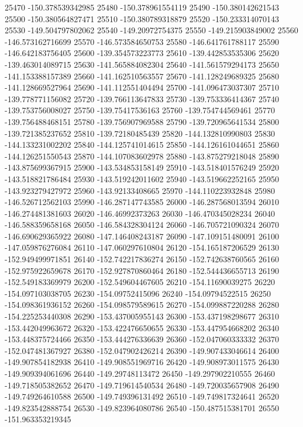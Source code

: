 {25470 -150.378539342985
25480 -150.378961554119
25490 -150.380142621543
25500 -150.380564827471
25510 -150.380789318879
25520 -150.233314070143
25530 -149.504797802062
25540 -149.20972754375
25550 -149.215903849002
25560 -146.573162716699
25570 -146.573584650753
25580 -146.641761788117
25590 -146.642183756405
25600 -139.354573223773
25610 -139.442853535306
25620 -139.463014089715
25630 -141.565884082304
25640 -141.561579294173
25650 -141.153388157389
25660 -141.162510563557
25670 -141.128249689325
25680 -141.128669527964
25690 -141.112551404494
25700 -141.096473037307
25710 -139.778771156082
25720 -139.766113647833
25730 -139.753336414367
25740 -139.753756008027
25750 -139.75417536163
25760 -139.754744569461
25770 -139.756488468151
25780 -139.756907969588
25790 -139.720965641534
25800 -139.721385237652
25810 -139.72180485439
25820 -144.132810990803
25830 -144.133231002202
25840 -144.125741014615
25850 -144.126161044651
25860 -144.126251550543
25870 -144.107083602978
25880 -143.875279218048
25890 -143.875699367915
25900 -143.534853158149
25910 -143.518401576249
25920 -143.518821786484
25930 -143.519242011602
25940 -143.519662252165
25950 -143.923279427972
25960 -143.92133408665
25970 -144.110223932848
25980 -146.526712562103
25990 -146.287147743585
26000 -146.287568013594
26010 -146.274481381603
26020 -146.46992373263
26030 -146.470345028234
26040 -146.588359658168
26050 -146.584328304124
26060 -146.705721090324
26070 -146.690629365922
26080 -147.146408243187
26090 -147.109151480091
26100 -147.059876276084
26110 -147.060297610804
26120 -154.165187206529
26130 -152.949499971851
26140 -152.742217836274
26150 -152.742638760565
26160 -152.975922659678
26170 -152.927870860464
26180 -152.544436655713
26190 -152.549183369979
26200 -152.549604467605
26210 -154.11690039275
26220 -154.097103038705
26230 -154.09752415096
26240 -154.09794522515
26250 -154.098361936152
26260 -154.098579589615
26270 -154.099887220288
26280 -154.225253440308
26290 -153.437005955143
26300 -153.437198298677
26310 -153.442049963672
26320 -153.422476650655
26330 -153.447954668202
26340 -153.448375724466
26350 -153.444276336639
26360 -152.047060333332
26370 -152.047481367927
26380 -152.047902426214
26390 -149.907433046614
26400 -149.907854182938
26410 -149.908551969716
26420 -149.908973011575
26430 -149.909394061696
26440 -149.29748113472
26450 -149.297902210555
26460 -149.718505382652
26470 -149.719614540534
26480 -149.720035657908
26490 -149.749264610588
26500 -149.749396131492
26510 -149.749817324641
26520 -149.823542888754
26530 -149.823964080786
26540 -150.487515381701
26550 -151.963353219345
}
